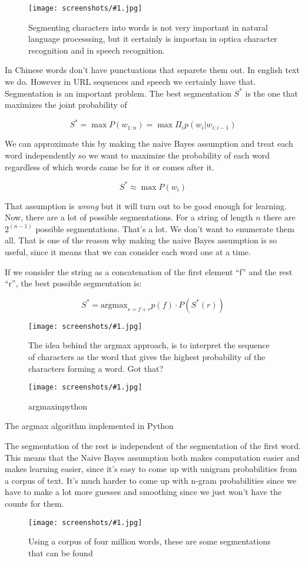\documentclass[a4, 12pt, english, USenglish]{scrreprt}
\newcommand{\screenshot}[2]{
\begin{figure}[htb]
\texttt{[image: screenshots/\#1.jpg]}
\label{#1}
\caption{#2}
\end{figure}}
\newcommand{\idx}[1]{{\em #1}\index{#1}}
\begin{document}
\screenshot{segmentation}{Segmenting characters into words is not very
important in natural language processsing, but it certainly is
importan in optica character recognition and in speech recognition.}

In Chinese words don't have   punctuations that separete them out.  In
english text we do.  However in URL  sequences and speech we certainly
have that.  Segmentation is an important problem.  The best
segmentation  \(S^*\) is the one that maximizes the joint probability
of 

\[
 S^* = \max P(w_{1:n}) = \max \Pi_i p(w_i|w_{i:i-1})
\]

We can approximate this by making the naive Bayes assumption and treat
each word independently so we want to maximize the probability of each
word regardless of which words came be for it or comes after it.

\[
  S^* \approx \max P(w_i)
\]

That assumption is \idx{wrong} but it will turn out to be good enough
for learning.   Now, there are a lot of possible segmentations.  For a
string of length \(n\) there are \(2^{(n-1)}\) possible
segmentations.  That's a lot.  We don't want to enumerate them all.
That is one of the reason why making the naive Bayes assumption is so
useful, since it means that we can consider each word  one at a time.

If we consider the string as a concatenation of the first element
``f'' and the rest ``r'', the best possible segmentation is:

\newcommand{\argmax}[1]{\ensuremath{\mbox{argmax}_{#1}}}

\[
   S^* = \argmax{s=f+r} p(f) \cdot P(S^*(r))
\]

\screenshot{argmaxsequencing}{The idea behind the argmax approach, is
  to interpret the sequence of characters as the word that gives the
  highest probability of the characters forming a word.  Got that?}
\screenshot{argmaxinpython}{argmaxinpython}{The argmax algorithm
  implemented in Python}

The segmentation of the rest is independent of the segmentation of the
first word.  This means that the Naive Bayes assumption both makes
computation easier and makes learning easier, since it's easy to come
up with unigram probabilities from a corpus of text.  It's much harder
to come up with n-gram probabilities since we have  to make a lot more
guesses and smoothing since we just won't have the counts for them.

\screenshot{fourmillioncorpus}{Using a corpus of four million words,
  these are some segmentations that can be found}
\end{document}
